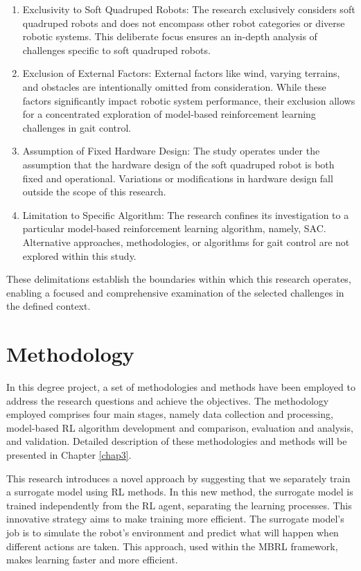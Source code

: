 \begin{enumerate}
    \item Exclusivity to Soft Quadruped Robots: The research exclusively considers soft quadruped robots and does not encompass other robot categories or diverse robotic systems. This deliberate focus ensures an in-depth analysis of challenges specific to soft quadruped robots.
    \item Exclusion of External Factors: External factors like wind, varying terrains, and obstacles are intentionally omitted from consideration. While these factors significantly impact robotic system performance, their exclusion allows for a concentrated exploration of model-based reinforcement learning challenges in gait control.
    \item Assumption of Fixed Hardware Design: The study operates under the assumption that the hardware design of the soft quadruped robot is both fixed and operational. Variations or modifications in hardware design fall outside the scope of this research.
    \item Limitation to Specific Algorithm: The research confines its investigation to a particular model-based reinforcement learning algorithm, namely, \ac{SAC}. Alternative approaches, methodologies, or algorithms for gait control are not explored within this study.
\end{enumerate}
These delimitations establish the boundaries within which this research operates, enabling a focused and comprehensive examination of the selected challenges in the defined context.

\section{Methodology}
In this degree project, a set of methodologies and methods have been employed to address the research questions and achieve the objectives. The methodology employed comprises four main stages, namely data collection and processing, model-based \ac{RL} algorithm development and comparison, evaluation and analysis, and validation. Detailed description of these methodologies and methods will be presented in Chapter \ref{chap3}. 

This research introduces a novel approach by suggesting that we separately train a surrogate model using RL methods. In this new method, the surrogate model is trained independently from the RL agent, separating the learning processes. This innovative strategy aims to make training more efficient. The surrogate model's job is to simulate the robot's environment and predict what will happen when different actions are taken. This approach, used within the MBRL framework, makes learning faster and more efficient.

